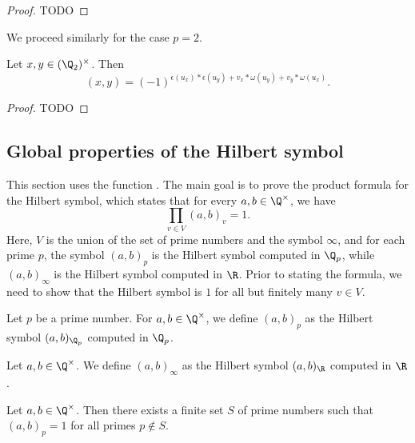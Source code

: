 \begin{proof}
	TODO
\end{proof}

We proceed similarly for the case $p = 2$.

\begin{theorem}
	\label{thm:padic_2}
	\leanok
Let $x,y \in (\Q_2)^\times$. Then
\[(x,y) = (-1)^{\epsilon(u_x)*\epsilon(u_y) + v_x * \omega(u_y) + v_y * \omega(u_x)}.\]
\end{theorem}

\begin{proof}
TODO
\end{proof}

\subsection{Global properties of the Hilbert symbol}

This section uses the  function . The main goal is to prove
the product formula for the Hilbert symbol, which states that for every $a, b \in \Q^\times$, we have
\[\prod_{v \in V} (a, b)_v = 1.\]
Here, $V$ is the union of the set of prime numbers and the symbol $\infty$, and for each prime $p$,
the symbol $(a, b)_p$ is the Hilbert symbol computed in $\Q_p$, while $(a, b)_\infty$ is the Hilbert
symbol computed in $\R$. Prior to stating the formula, we need to show that the Hilbert
symbol is $1$ for all but finitely many $v \in V$.

\begin{definition}
	\label{def:at_p}
	\leanok
Let $p$ be a prime number. For $a, b \in \Q^\times$, we define $(a, b)_p$ as the Hilbert symbol
$(a,b)_{\Q_p}$ computed in $\Q_p$.
\end{definition}

\begin{definition}
	\label{def:at_infty}
	\leanok
Let $a, b \in \Q^\times$. We define $(a, b)_\infty$ as the Hilbert symbol $(a,b)_{\R}$ computed in $\R$.
\end{definition}

\begin{theorem}
	\label{thm:almost_all_one}
	\leanok
Let $a, b \in \Q^\times$. Then there exists a finite set $S$ of prime numbers such that
$(a, b)_p = 1$ for all primes $p \notin S$.
\end{theorem}

